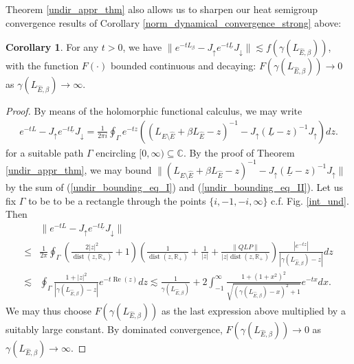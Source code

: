 \documentclass[reqno,12pt,letterpaper]{amsart}
\numberwithin{equation}{section}
\newcommand{\dist}{{\operatorname{dist}}}
\renewcommand{\Re}{\operatorname{Re}}
\newcommand{\1}{\mathds{1}}
\theoremstyle{definition}
\newtheorem{Cor}[Th]{Corollary}
\begin{document}
Theorem \ref{undir_appr_thm} also allows us to sharpen our heat semigroup convergence results of Corollary \ref{norm_dynamical_convergence_strong} above:
	\begin{Cor}\label{norm_dynamical_convergence}
	For any $t > 0$, we have $\|e^{-tL_\beta} - J_\uparrow e^{-t\underline{L}} J_\downarrow \| \lesssim f(\gamma(L_{\hat{E},\beta}) )$, with the function $F(\cdot)$ bounded continuous and decaying: $F(\gamma(L_{\hat{E},\beta})) \rightarrow 0$ as $\gamma(L_{\hat{E},\beta}) \rightarrow  \infty$.
	\end{Cor}
\begin{proof}
By means of the holomorphic functional calculus, we may write
\begin{align}
	e^{-tL} - J_\uparrow e^{-t\underline{L}} J_\downarrow = \frac{1}{2 \pi i } \oint_{\Gamma} e^{-tz} \left( 	(L_{E\setminus \hat{E}} + \beta  L_{ \hat{E}}  - z)^{-1} - J_\uparrow (\underline{L} - z)^{-1}J_\uparrow \right)dz.
\end{align}
for a suitable path $\Gamma$ encircling $[0, \infty) \subseteq \mathds{C}$. By the proof of Theorem \ref{undir_appr_thm}, we may bound $\|(L_{E\setminus \hat{E}} + \beta  L_{ \hat{E}}  - z)^{-1} - J_\uparrow (\underline{L} - z)^{-1}J_\uparrow \|$ by the sum of (\ref{undir_bounding_eq_I}) and (\ref{undir_bounding_eq_II}). Let us fix $\Gamma$ to be 
 to be a rectangle through the points $\{i,-1,-i, \infty\}$ c.f. Fig. \ref{int_und}. Then
\begin{align}
	&\|	e^{-tL} - J_\uparrow e^{-t\underline{L}} J_\downarrow\| \\
	\leq & \frac{1}{2 \pi} \oint_\Gamma \left(\frac{2 |z|^2}{\dist(z, \mathds{R}_+)} +1\right) \left(\frac{1}{\dist(z, \mathds{R}_+)} + \frac{1}{|z|} + \frac{\|QLP\|}{|z| \dist(z, \mathds{R}_+)} \right) \frac{|e^{-tz}|}{|\gamma(L_{\hat{E},\beta})  - z | }dz\\
	\lesssim & \oint_\Gamma \frac{1 + |z|^2}{|\gamma(L_{\hat{E},\beta})  - z |} e^{-t\Re(z)}dz
	\lesssim \frac{1}{\gamma(L_{\hat{E},\beta})} + 2\int_{-1}^\infty \frac{1 + (1 + x^2)^2}{\sqrt{(\gamma(L_{\hat{E},\beta}) - x )^2 +1 }} e^{-tx}dx.
\end{align}
 We may thus choose $F(\gamma(L_{\hat{E},\beta}))$ as the last expression above multiplied by a suitably large constant. By dominated convergence,  $F(\gamma(L_{\hat{E},\beta})) \rightarrow 0$ as $\gamma(L_{\hat{E},\beta}) \rightarrow  \infty$.
\end{proof}
	
\end{document}
